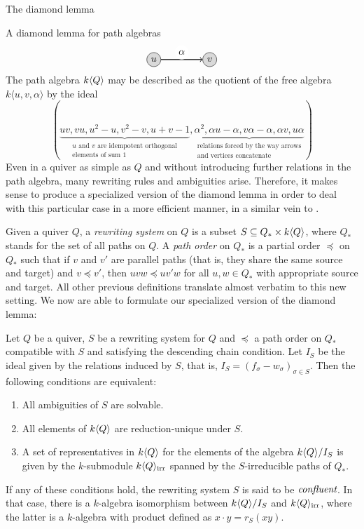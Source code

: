 \begin{chapter}{The diamond lemma}
\begin{section}{A diamond lemma for path algebras}
\[
\begin{tikzpicture}[->,node distance=1cm, thick]
\tikzstyle{every node} = [circle, fill=gray!30, minimum size=.5cm, inner sep=.07cm, draw=black, thin]
\node (1) at (0,0) {$u$};
\node (2) at (2,0) {$v$};
\draw (1) -- (2) node[midway, above, fill=white, draw=none] {$\alpha$};
\end{tikzpicture}
\]
The path algebra $k\langle Q\rangle$ may be described as the quotient of the free algebra $k\langle u,v,\alpha\rangle$ by the ideal
\[(\underbrace{uv, vu, u^2-u, v^2-v, u+v-1}_{\substack{\text{$u$ and $v$ are idempotent orthogonal}\\\text{elements of sum $1$}}}, \underbrace{\alpha^2, \alpha u-\alpha, v\alpha-\alpha, \alpha v,u\alpha }_{\substack{\text{relations forced by the way arrows}\\\text{and vertices concatenate}}})\]
Even in a quiver as simple as $Q$ and without introducing further relations in the path algebra, many rewriting rules and ambiguities arise. Therefore, it makes sense to produce a specialized version of the diamond lemma in order to deal with this particular case in a more efficient manner, in a similar vein to \cite{FFG93}.

Given a quiver $Q$, a \emph{rewriting system} on $Q$ is a subset $S\subseteq Q_*\times k\langle Q\rangle$, where $Q_*$ stands for the set of all paths on $Q$. A \emph{path order} on $Q_*$ is a partial order $\preceq$ on $Q_*$ such that if $v$ and $v'$ are parallel paths (that is, they share the same source and target) and $v\preceq v'$, then $uvw\preceq uv'w$ for all $u,w\in Q_*$ with appropriate source and target. All other previous definitions translate almost verbatim to this new setting. We now are able to formulate our specialized version of the diamond lemma:

\begin{thm}\label{quiver-diamond-lemma} Let $Q$ be a quiver, $S$ be a rewriting system for $Q$ and $\preceq$ a path order on $Q_*$ compatible with $S$ and satisfying the descending chain condition. Let $I_S$ be the ideal given by the relations induced by $S$, that is, $I_S=(f_\sigma-w_\sigma)_{\sigma\in S}$. Then the following conditions are equivalent:
\begin{enumerate}
\item All ambiguities of $S$ are solvable.
\item All elements of $k\langle Q\rangle$ are reduction-unique under $S$.
\item A set of representatives in $k\langle Q\rangle$ for the elements of the algebra $k\langle Q\rangle/I_S$ is given by the $k$-submodule $k\langle Q\rangle_{\mathrm{irr}}$ spanned by the $S$-irreducible paths of $Q_*$.
\end{enumerate}
If any of these conditions hold, the rewriting system $S$ is said to be $\emph{confluent}$. In that case, there is a $k$-algebra isomorphism between $k\langle Q\rangle/I_S$ and $k\langle Q\rangle_{\mathrm{irr}}$, where the latter is a $k$-algebra with product defined as $x\cdot y= r_S(xy)$.
\end{thm}


\end{section}
\end{chapter}
